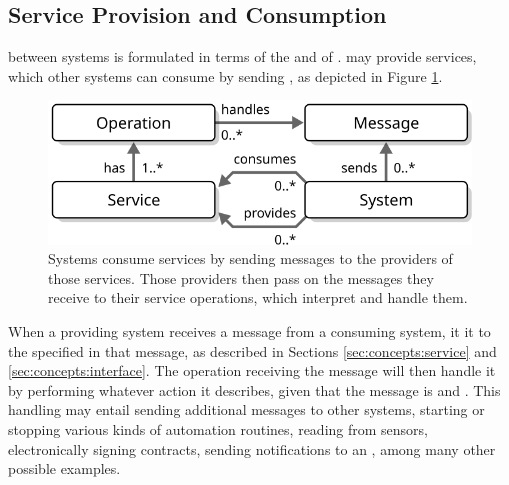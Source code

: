 \vspace*{-3mm}

\subsection{Service Provision and Consumption}

 between systems is formulated in terms of the  and  of .
 may provide services, which other systems can consume by sending , as depicted in Figure \ref{fig:service-consumption}.

\begin{figure}[ht!]
  \centering
  \includegraphics[scale=0.9]{figures/service-consumption}
  \caption{
    Systems consume services by sending messages to the providers of those services.
    Those providers then pass on the messages they receive to their service operations, which interpret and handle them.
  }
  \label{fig:service-consumption}
\end{figure}

When a providing system receives a message from a consuming system, it  it to the  specified in that message, as described in Sections \ref{sec:concepts:service} and \ref{sec:concepts:interface}.
The operation receiving the message will then handle it by performing whatever action it describes, given that the message is  and .
This handling may entail sending additional messages to other systems, starting or stopping various kinds of automation routines, reading from sensors, electronically signing contracts, sending notifications to an , among many other possible examples.


